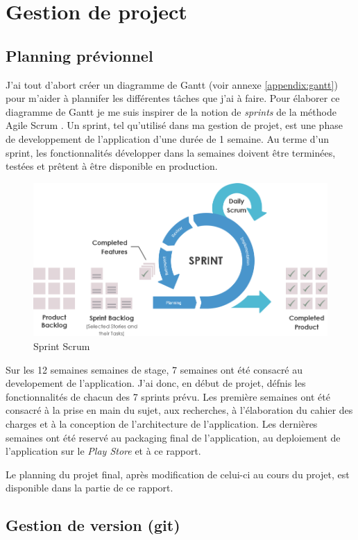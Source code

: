 \section{Gestion de project}

\subsection{Planning prévionnel}

J'ai tout d'abort créer un diagramme de Gantt (voir annexe \ref{appendix:gantt}) pour m'aider à plannifer les différentes tâches que j'ai à faire. Pour élaborer ce diagramme de Gantt je me suis inspirer de la notion de \textit{sprints} de la méthode Agile Scrum \cite{scrum}. Un sprint, tel qu'utilisé dans ma gestion de projet, est une phase de developpement de l'application d'une durée de 1 semaine. Au terme d'un sprint, les fonctionnalités développer dans la semaines doivent être terminées, testées et prêtent à être disponible en production.

\begin{figure}
  \includegraphics[width=.7\linewidth]{content/imgs/scrum_sprint.png}
  \caption{Sprint Scrum}
\end{figure}

Sur les 12 semaines semaines de stage, 7 semaines ont été consacré au developement de l'application. J'ai donc, en début de projet, défnis les fonctionnalités de  chacun des 7 sprints prévu. Les première semaines ont été consacré à la prise en main du sujet, aux recherches, à l'élaboration du cahier des charges et à la conception de l'architecture de l'application. Les dernières semaines ont été reservé au packaging final de l'application, au deploiement de l'application sur le \textit{Play Store} et à ce rapport.

Le planning du projet final, après modification de celui-ci au cours du projet, est disponible dans la partie  de ce rapport.

\subsection{Gestion de version (git)}

